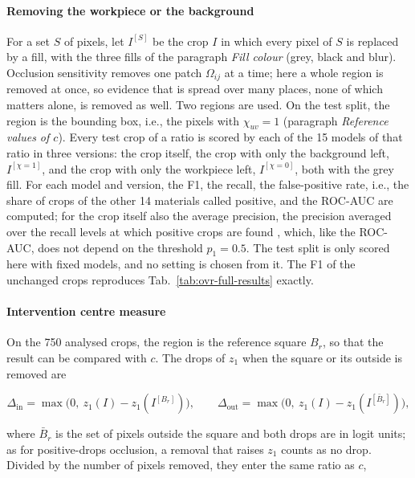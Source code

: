 \paragraph{Removing the workpiece or the background}
\label{sec:methodology-removal}
For a set $S$ of pixels, let $I^{[S]}$ be the crop $I$ in which every pixel of $S$
is replaced by a fill, with the three fills of the paragraph \emph{Fill colour}
(grey, black and blur). Occlusion sensitivity removes one patch $\Omega_{ij}$ at a time;
here a whole region is removed at once, so evidence that is spread over many places,
none of which matters alone, is removed as well. Two regions are used. On the test
split, the region is the bounding box, i.e., the pixels with $\chi_{uv} = 1$ (paragraph
\emph{Reference values of $c$}). Every test crop of a ratio is scored by each of the 15
models of that ratio in three versions: the crop itself, the crop with only the
background left, $I^{[\chi = 1]}$, and the crop with only the workpiece left,
$I^{[\chi = 0]}$, both with the grey fill. For each model and version, the F1, the
recall, the false-positive rate, i.e., the share of crops of the other 14 materials
called positive, and the ROC-AUC \citep{fawcett2006roc} are computed; for the crop
itself also the average precision, the precision averaged over the recall levels at
which positive crops are found \citep{pedregosa2011scikit}, which, like the ROC-AUC, does
not depend on the threshold $p_1 = 0.5$. The test split is only scored here with fixed
models, and no setting is chosen from it. The F1 of the unchanged crops reproduces
Tab.~\ref{tab:ovr-full-results} exactly.

\paragraph{Intervention centre measure}
\label{sec:methodology-cint}
On the 750 analysed crops, the region is the reference square $B_r$, so that the result
can be compared with $c$. The drops of $z_1$ when the square or its outside is
removed are

\begin{equation}
\Delta_{\mathrm{in}} = \max\big(0,\ z_1(I) - z_1(I^{[B_r]})\big), \qquad
\Delta_{\mathrm{out}} = \max\big(0,\ z_1(I) - z_1(I^{[\bar{B}_r]})\big),
\label{eq:cint-drops}
\end{equation}

where $\bar{B}_r$ is the set of pixels outside the square and both drops are in logit
units; as for positive-drops occlusion, a removal that raises $z_1$ counts as no drop.
Divided by the number of pixels removed, they enter the same ratio as $c$,

